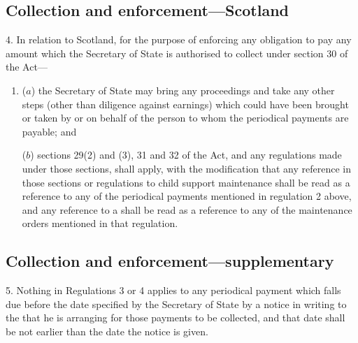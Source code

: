 \documentclass[12pt,a4paper]{article}
\begin{document}

\subsection[4. Collection and enforcement—Scotland]{Collection and enforcement—Scotland}

4.  In relation to Scotland, for the purpose of enforcing any obligation to pay any amount which the Secretary of State is authorised to collect under section 30 of the Act—
\begin{enumerate}\item[]
($a$) the Secretary of State may bring any proceedings and take any other steps (other than diligence against earnings) which could have been brought or taken by or on behalf of the person to whom the periodical payments are payable; and

($b$) sections 29(2) and (3), 31 and 32 of the Act, and any regulations made under those sections, shall apply, with the modification that any reference in those sections or regulations to child support maintenance shall be read as a reference to any of the periodical payments mentioned in regulation 2 above, and any reference to a 
shall be read as a reference to any of the maintenance orders mentioned in that regulation.
\end{enumerate}


\subsection[5. Collection and enforcement—supplementary]{Collection and enforcement—supplementary}

5.  Nothing in Regulations 3 or 4 applies to any periodical payment which falls due before the date specified by the Secretary of State by a notice in writing to the 
that he is arranging for those payments to be collected, and that date shall be not earlier than the date the notice is given.
\end{document}
